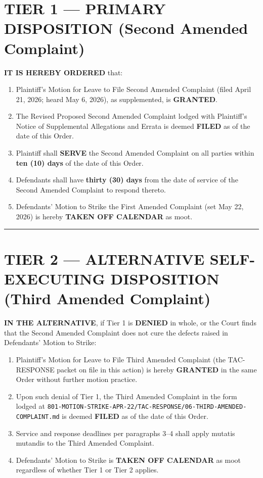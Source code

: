 \section{TIER 1 --- PRIMARY DISPOSITION (Second Amended Complaint)}\label{tier-1-primary-disposition-second-amended-complaint}

\textbf{IT IS HEREBY ORDERED} that:

\begin{enumerate}
\def\labelenumi{\arabic{enumi}.}
\item
  Plaintiff's Motion for Leave to File Second Amended Complaint (filed April 21, 2026; heard May 6, 2026), as supplemented, is \textbf{GRANTED}.
\item
  The Revised Proposed Second Amended Complaint lodged with Plaintiff's Notice of Supplemental Allegations and Errata is deemed \textbf{FILED} as of the date of this Order.
\item
  Plaintiff shall \textbf{SERVE} the Second Amended Complaint on all parties within \textbf{ten (10) days} of the date of this Order.
\item
  Defendants shall have \textbf{thirty (30) days} from the date of service of the Second Amended Complaint to respond thereto.
\item
  Defendants' Motion to Strike the First Amended Complaint (set May 22, 2026) is hereby \textbf{TAKEN OFF CALENDAR} as moot.
\end{enumerate}

\begin{center}\rule{0.5\linewidth}{0.5pt}\end{center}

\section{TIER 2 --- ALTERNATIVE SELF-EXECUTING DISPOSITION (Third Amended Complaint)}\label{tier-2-alternative-self-executing-disposition-third-amended-complaint}

\textbf{IN THE ALTERNATIVE}, if Tier 1 is \textbf{DENIED} in whole, or the Court finds that the Second Amended Complaint does not cure the defects raised in Defendants' Motion to Strike:

\begin{enumerate}
\def\labelenumi{\arabic{enumi}.}
\setcounter{enumi}{5}
\item
  Plaintiff's Motion for Leave to File Third Amended Complaint (the TAC-RESPONSE packet on file in this action) is hereby \textbf{GRANTED} in the same Order without further motion practice.
\item
  Upon such denial of Tier 1, the Third Amended Complaint in the form lodged at \texttt{801-MOTION-STRIKE-APR-22/TAC-RESPONSE/06-THIRD-AMENDED-COMPLAINT.md} is deemed \textbf{FILED} as of the date of this Order.
\item
  Service and response deadlines per paragraphs 3--4 shall apply mutatis mutandis to the Third Amended Complaint.
\item
  Defendants' Motion to Strike is \textbf{TAKEN OFF CALENDAR} as moot regardless of whether Tier 1 or Tier 2 applies.
\end{enumerate}

